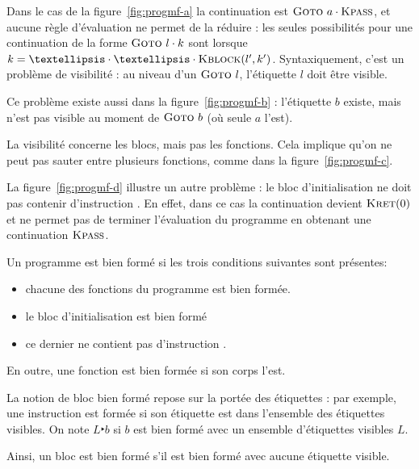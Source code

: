 Dans le cas de la figure~\ref{fig:progmf-a} la continuation est $\textsc{Goto}~a
\cdot \textsc{Kpass}$, et aucune règle d'évaluation ne permet de la réduire : les seules
possibilités pour une continuation de la forme $\textsc{Goto}~l \cdot k$ sont
lorsque $k = … \cdot … \cdot \kBlock{l'}{k'}$. Syntaxiquement, c'est un problème
de visibilité : au niveau d'un $\textsc{Goto}~l$, l'étiquette $l$ doit être visible.

Ce problème existe aussi dans la figure~\ref{fig:progmf-b} : l'étiquette $b$
existe, mais n'est pas visible au moment de $\textsc{Goto}~b$ (où seule $a$ l'est).

La visibilité concerne les blocs, mais pas les fonctions. Cela implique qu'on ne
peut pas sauter entre plusieurs fonctions, comme dans la
figure~\ref{fig:progmf-c}.

La figure~\ref{fig:progmf-d} illustre un autre problème : le bloc
d'initialisation ne doit pas contenir d'instruction \phx{\npkReturn}. En effet,
dans ce cas la continuation devient $\textsc{Kret}(0)$ et ne permet pas de terminer
l'évaluation du programme en obtenant une continuation $\textsc{Kpass}$.

Un programme est bien formé si les trois conditions suivantes sont
présentes:

\begin{itemize}
\item
  chacune des fonctions du programme est bien formée.
\item
  le bloc d'initialisation est bien formé
\item
  ce dernier ne contient pas d'instruction
  \phx{\npkReturn}.
\end{itemize}

En outre, une fonction est bien formée si son corps l'est.


La notion de bloc bien formé repose sur la portée des étiquettes : par exemple,
une instruction \phx{\npkGoto} est formée si son étiquette est dans l'ensemble
des étiquettes visibles. On note $L ‣ b$ si $b$ est bien formé avec un ensemble
d'étiquettes visibles $L$.

Ainsi, un bloc est bien formé s'il est bien formé avec aucune étiquette visible.

